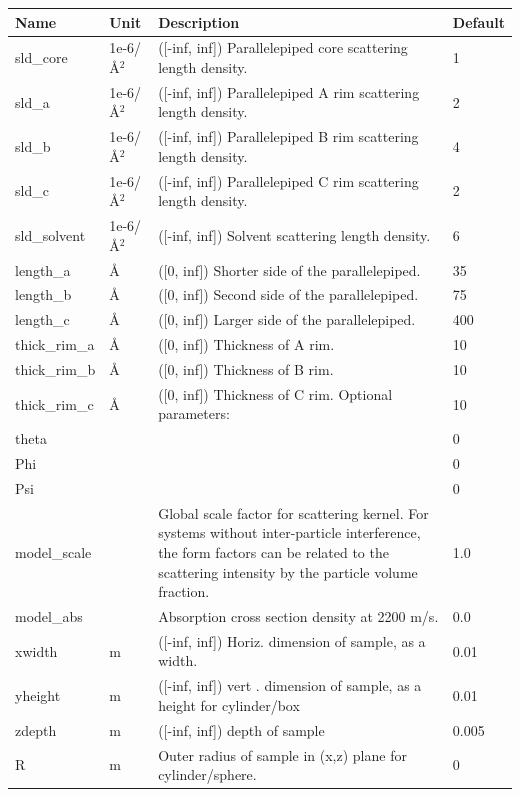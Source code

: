 \begin{longtable}{p{}p{}p{}p{}}
\toprule
\textbf{Name} & \textbf{Unit} & \textbf{Description} & \textbf{Default} \\
\midrule
\endhead
sld\_core & 1e-6/\AA{}$^{2}$ & ([-inf, inf]) Parallelepiped core scattering length density. & 1 \\
sld\_a & 1e-6/\AA{}$^{2}$ & ([-inf, inf]) Parallelepiped A rim scattering length density. & 2 \\
sld\_b & 1e-6/\AA{}$^{2}$ & ([-inf, inf]) Parallelepiped B rim scattering length density. & 4 \\
sld\_c & 1e-6/\AA{}$^{2}$ & ([-inf, inf]) Parallelepiped C rim scattering length density. & 2 \\
sld\_solvent & 1e-6/\AA{}$^{2}$ & ([-inf, inf]) Solvent scattering length density. & 6 \\
length\_a & \AA{} & ([0, inf]) Shorter side of the parallelepiped. & 35 \\
length\_b & \AA{} & ([0, inf]) Second side of the parallelepiped. & 75 \\
length\_c & \AA{} & ([0, inf]) Larger side of the parallelepiped. & 400 \\
thick\_rim\_a & \AA{} & ([0, inf]) Thickness of A rim. & 10 \\
thick\_rim\_b & \AA{} & ([0, inf]) Thickness of B rim. & 10 \\
thick\_rim\_c & \AA{} & ([0, inf]) Thickness of C rim. Optional parameters: & 10 \\
theta &  &  & 0 \\
Phi &  &  & 0 \\
Psi &  &  & 0 \\
model\_scale &   & Global scale factor for scattering kernel. For systems without inter-particle interference, the form factors can be related to the scattering intensity by the particle volume fraction. & 1.0 \\
model\_abs &   & Absorption cross section density at 2200 m/s. & 0.0 \\
xwidth & m & ([-inf, inf]) Horiz. dimension of sample, as a width. & 0.01 \\
yheight & m & ([-inf, inf]) vert . dimension of sample, as a height for cylinder/box & 0.01 \\
zdepth & m & ([-inf, inf]) depth of sample & 0.005 \\
R & m & Outer radius of sample in (x,z) plane for cylinder/sphere. & 0 \\

\end{longtable}
